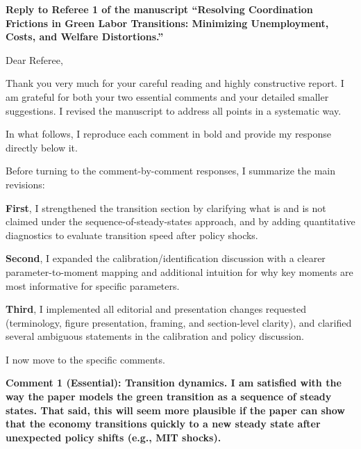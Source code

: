 \documentclass[12pt]{article}
\begin{document}
\theoremstyle{definition}
\newtheorem{definition}{Definition}
\theoremstyle{definition}
\newtheorem{result}{Result}
\theoremstyle{plain}
\newtheorem{lemma}{Lemma}
\theoremstyle{plain}
\newtheorem{proposition}{Proposition}
\theoremstyle{plain}
\newtheorem{theorem}{Theorem}
\theoremstyle{plain}
\newtheorem{corollary}{Corollary}

\begin{onehalfspacing}

\vspace{1.0cm}

\noindent \textbf{Reply to Referee 1 of the manuscript ``Resolving Coordination Frictions in Green Labor Transitions: Minimizing Unemployment, Costs, and Welfare Distortions.''}

\bigskip

Dear Referee,

\medskip

Thank you very much for your careful reading and highly constructive report. I am grateful for both your two essential comments and your detailed smaller suggestions. I revised the manuscript to address all points in a systematic way.

In what follows, I reproduce each comment in bold and provide my response directly below it.

Before turning to the comment-by-comment responses, I summarize the main revisions:

\textbf{First}, I strengthened the transition section by clarifying what is and is not claimed under the sequence-of-steady-states approach, and by adding quantitative diagnostics to evaluate transition speed after policy shocks.

\textbf{Second}, I expanded the calibration/identification discussion with a clearer parameter-to-moment mapping and additional intuition for why key moments are most informative for specific parameters.

\textbf{Third}, I implemented all editorial and presentation changes requested (terminology, figure presentation, framing, and section-level clarity), and clarified several ambiguous statements in the calibration and policy discussion.

I now move to the specific comments.

\bigskip
\bigskip

\textbf{Comment 1 (Essential): Transition dynamics. I am satisfied with the way the paper models the green transition as a sequence of steady states. That said, this will seem more plausible if the paper can show that the economy transitions quickly to a new steady state after unexpected policy shifts (e.g., MIT shocks).}


\end{onehalfspacing}
\end{document}
